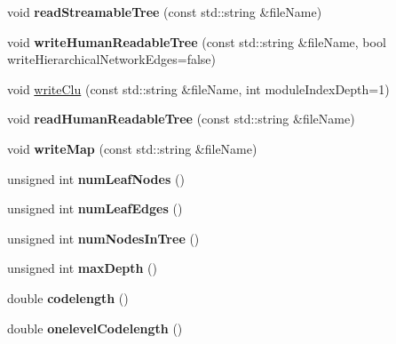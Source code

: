 \begin{DoxyCompactItemize}
void {\bfseries read\+Streamable\+Tree} (const std\+::string \&file\+Name)
\item 
\mbox{\label{classHierarchicalNetwork_a5509ce6488faffc61cb623c680711264}} 
void {\bfseries write\+Human\+Readable\+Tree} (const std\+::string \&file\+Name, bool write\+Hierarchical\+Network\+Edges=false)
\item 
void \mbox{\hyperlink{classHierarchicalNetwork_a301ba28d5feabede47f09a2fc31b877c}{write\+Clu}} (const std\+::string \&file\+Name, int module\+Index\+Depth=1)
\item 
\mbox{\label{classHierarchicalNetwork_af2e8b7af34535045aed66452c4ee5bc4}} 
void {\bfseries read\+Human\+Readable\+Tree} (const std\+::string \&file\+Name)
\item 
\mbox{\label{classHierarchicalNetwork_a5d7e90b8b48a526af9b9d61b821a6f4c}} 
void {\bfseries write\+Map} (const std\+::string \&file\+Name)
\item 
\mbox{\label{classHierarchicalNetwork_a62565042b8b8751558d675598fb27424}} 
unsigned int {\bfseries num\+Leaf\+Nodes} ()
\item 
\mbox{\label{classHierarchicalNetwork_a8aebde60085e920969f1a00813878f83}} 
unsigned int {\bfseries num\+Leaf\+Edges} ()
\item 
\mbox{\label{classHierarchicalNetwork_aa198250500a51b7ceb01dbf28eeffe44}} 
unsigned int {\bfseries num\+Nodes\+In\+Tree} ()
\item 
\mbox{\label{classHierarchicalNetwork_a2de0f643f5857df68c8b8e6340efb7cd}} 
unsigned int {\bfseries max\+Depth} ()
\item 
\mbox{\label{classHierarchicalNetwork_ac17f2850618df2f7f07254888384b6e6}} 
double {\bfseries codelength} ()
\item 
\mbox{\label{classHierarchicalNetwork_a0d7789ad89fd4375fd4f45fe3ef86321}} 
double {\bfseries onelevel\+Codelength} ()
\end{DoxyCompactItemize}


